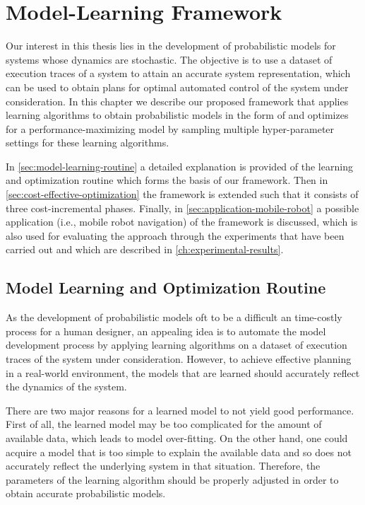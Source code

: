 \chapter{Model-Learning Framework}
\label{ch:methodology} %

Our interest in this thesis lies in the development of probabilistic models for systems whose dynamics are stochastic.
The objective is to use a dataset of execution traces of a system to attain an accurate system representation, which can be used to obtain plans for optimal automated control of the system under consideration.
In this chapter we describe our proposed framework that applies learning algorithms to obtain probabilistic models in the form of  and optimizes for a performance-maximizing model by sampling multiple hyper-parameter settings for these learning algorithms.

In \autoref{sec:model-learning-routine} a detailed explanation is provided of the learning and optimization routine which forms the basis of our framework.
Then in \autoref{sec:cost-effective-optimization} the framework is extended such that it consists of three cost-incremental phases.
Finally, in \autoref{sec:application-mobile-robot} a possible application (i.e., mobile robot navigation) of the framework is discussed, which is also used for evaluating the approach through the experiments that have been carried out and which are described in \autoref{ch:experimental-results}.

\section{Model Learning and Optimization Routine}
\label{sec:model-learning-routine}

As the development of probabilistic models oft to be a difficult an time-costly process for a human designer, an appealing idea is to automate the model development process by applying learning algorithms on a dataset of execution traces of the system under consideration.
However, to achieve effective planning in a real-world environment, the models that are learned should accurately reflect the dynamics of the system.

There are two major reasons for a learned model to not yield good performance.
First of all, the learned model may be too complicated for the amount of available data, which leads to model over-fitting.
On the other hand, one could acquire a model that is too simple to explain the available data and so does not accurately reflect the underlying system in that situation.
Therefore, the parameters of the learning algorithm should be properly adjusted in order to obtain accurate probabilistic models.

